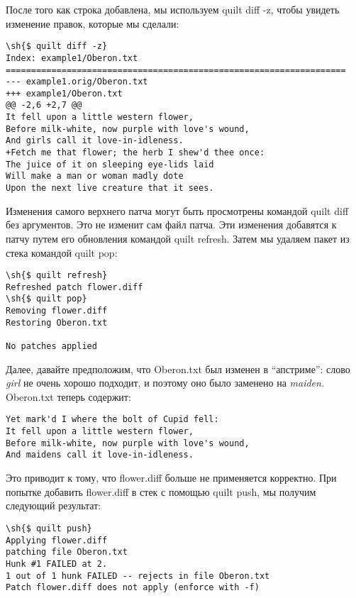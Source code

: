 \documentclass{article}
\newcommand{\quilt}[1]{\textsf{quilt #1}}
\renewcommand{\sh}[1]{\textsl{#1}}
\begin{document}
После того как строка добавлена, мы используем \quilt{diff -z}, чтобы увидеть изменение правок, которые мы сделали:

\begin{small}
\begin{Verbatim}
\sh{$ quilt diff -z}
Index: example1/Oberon.txt
===================================================================
--- example1.orig/Oberon.txt
+++ example1/Oberon.txt
@@ -2,6 +2,7 @@
It fell upon a little western flower,
Before milk-white, now purple with love's wound,
And girls call it love-in-idleness.
+Fetch me that flower; the herb I shew'd thee once:
The juice of it on sleeping eye-lids laid
Will make a man or woman madly dote
Upon the next live creature that it sees.
\end{Verbatim}
\end{small}

Изменения самого верхнего патча могут быть просмотрены командой \quilt{diff} без аргументов. Это не изменит сам файл патча. Эти изменения добавятся к патчу путем его обновления командой \quilt{refresh}. Затем мы удаляем пакет из стека командой \quilt{pop}:

\begin{small}
\begin{Verbatim}
\sh{$ quilt refresh}
Refreshed patch flower.diff
\sh{$ quilt pop}
Removing flower.diff
Restoring Oberon.txt

No patches applied
\end{Verbatim}
\end{small}

Далее, давайте предположим, что \textsf{Oberon.txt} был изменен в ``апстриме'': слово \textit{girl} не очень хорошо подходит, и поэтому оно было заменено на \textit{maiden.} \textsf{Oberon.txt} теперь содержит:

\begin{small}
\begin{Verbatim}
Yet mark'd I where the bolt of Cupid fell:
It fell upon a little western flower,
Before milk-white, now purple with love's wound,
And maidens call it love-in-idleness.
\end{Verbatim}
\end{small}

Это приводит к тому, что \textsf{flower.diff} больше не применяется корректно. При попытке добавить \textsf{flower.diff} в стек с помощью \quilt{push}, мы получим следующий результат:

\begin{small}
\begin{Verbatim}
\sh{$ quilt push}
Applying flower.diff
patching file Oberon.txt
Hunk #1 FAILED at 2.
1 out of 1 hunk FAILED -- rejects in file Oberon.txt
Patch flower.diff does not apply (enforce with -f)
\end{Verbatim}
\end{small}
\end{document}

